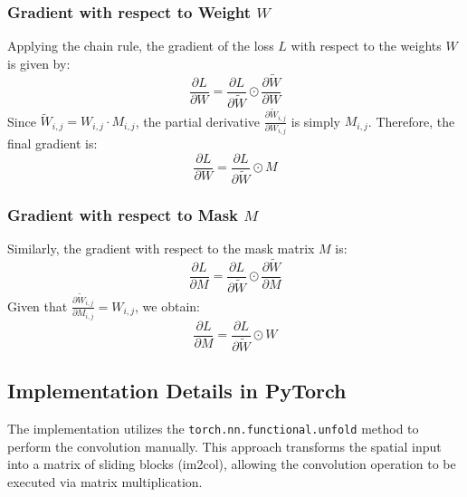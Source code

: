 \documentclass{article}
\begin{document}
\subsubsection*{Gradient with respect to Weight $W$}
Applying the chain rule, the gradient of the loss $L$ with respect to the weights $W$ is given by:
\[ \frac{\partial L}{\partial W} = \frac{\partial L}{\partial \tilde{W}} \odot \frac{\partial \tilde{W}}{\partial W} \]
Since $\tilde{W}_{i,j} = W_{i,j} \cdot M_{i,j}$, the partial derivative $\frac{\partial \tilde{W}_{i,j}}{\partial W_{i,j}}$ is simply $M_{i,j}$. Therefore, the final gradient is:
\begin{equation}
\frac{\partial L}{\partial W} = \frac{\partial L}{\partial \tilde{W}} \odot M
\end{equation}

\subsubsection*{Gradient with respect to Mask $M$}
Similarly, the gradient with respect to the mask matrix $M$ is:
\[ \frac{\partial L}{\partial M} = \frac{\partial L}{\partial \tilde{W}} \odot \frac{\partial \tilde{W}}{\partial M} \]
Given that $\frac{\partial \tilde{W}_{i,j}}{\partial M_{i,j}} = W_{i,j}$, we obtain:
\begin{equation}
\frac{\partial L}{\partial M} = \frac{\partial L}{\partial \tilde{W}} \odot W
\end{equation}

\newpage
\subsection{Implementation Details in PyTorch}
The implementation utilizes the \texttt{torch.nn.functional.unfold} method to perform the convolution manually. This approach transforms the spatial input into a matrix of sliding blocks (im2col), allowing the convolution operation to be executed via matrix multiplication.
\end{document}

